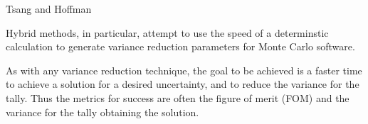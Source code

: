 Tsang and Hoffman \cite{tsang_monte_1988}

Hybrid methods, in particular, attempt to use the speed of a determinstic calculation to generate variance reduction parameters for Monte Carlo software. 

As with any variance reduction technique, the goal to be achieved is a faster time to achieve a solution for a desired uncertainty, and to reduce the variance for the tally. 
Thus the metrics for success are often the figure of merit (FOM) and the variance for the tally obtaining the solution. 